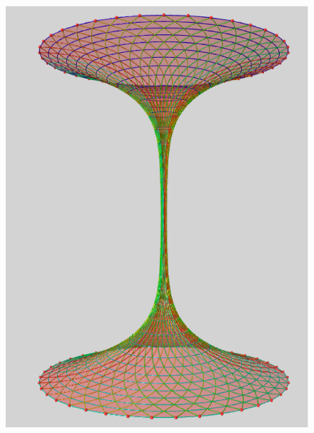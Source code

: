 \documentclass {report}
\begin{document}
\begin{figure}[h!]
\begin{minipage}[b]{0.30\linewidth}
   \end{minipage}\hfill
   \begin{minipage}[b]{0.3\linewidth}   
     \centering \includegraphics[scale=0.197]{Images_Fichiers/8.eps}
      

\end{minipage}
\end{figure}
\end{document}

